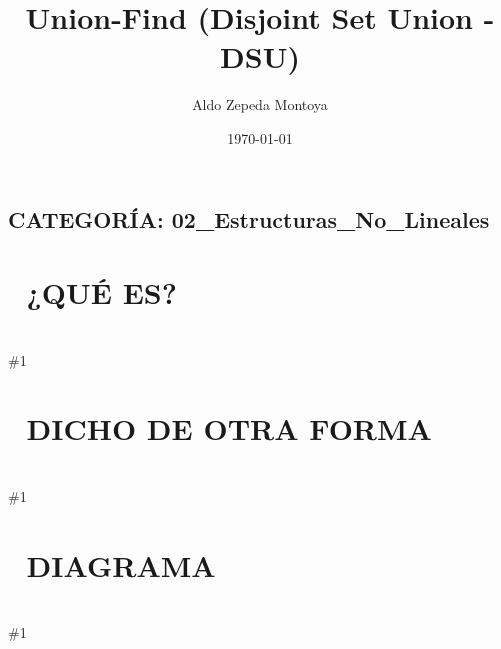 \documentclass{article}
\newcommand{\quees}[1]{
    \section*{🤔 ¿QUÉ ES?}
    \hrulefill \\
    \#1
}
\newcommand{\dichodeotraforma}[1]{
    \section*{💬 DICHO DE OTRA FORMA}
    \hrulefill \\
    \#1
}
\newcommand{\diagrama}[1]{
    \section*{🎨 DIAGRAMA}
    \hrulefill \\
    \#1
}
\begin{document}
\title{Union-Find (Disjoint Set Union - DSU)}
\author{Aldo Zepeda Montoya}
\date{\today}
\maketitle

\subsection*{CATEGORÍA: 02\_Estructuras\_No\_Lineales}

\quees{
Los clubes de la escuela 🏫. Al principio, cada estudiante es su
propio club (un conjunto de 1 persona). 

Cuando dos personas se hacen amigas, sus clubes se UNEN. Para saber 
si dos personas están en el mismo club, sigues la cadena de amistades
hasta llegar al "líder" del grupo. Si ambos tienen el mismo líder,
entonces ¡están en el mismo club!

Es una estructura que gestiona grupos de elementos que no se 
traslapan y te permite unirlos o preguntar si están conectados 
muy rápido.
}

\dichodeotraforma{
Union-Find (o DSU) es una estructura de datos que mantiene un 
conjunto de elementos divididos en varios conjuntos disjuntos. 
Soporta dos operaciones principales:

1. Find: Determina a qué conjunto pertenece un elemento (devuelve
   el "representante" o "líder" del conjunto).
2. Union: Une dos conjuntos en uno solo.

Con optimizaciones como "Path Compression" y "Union by Rank", estas
operaciones se vuelven prácticamente instantáneas O(α(n)).
}

\diagrama{\begin{verbatim}
Estado Inicial: {0} {1} {2} {3} {4}
(Cada uno apunta a sí mismo como líder)

Union(0, 1): {0, 1} {2} {3} {4}
  [0] ← [1] (0 es el líder de 1)

Union(1, 2): {0, 1, 2} {3} {4}
  [0] ← [1] ← [2]

Path Compression (al buscar el líder de 2):
  [0] ← [1], [0] ← [2] (Ahora 2 apunta directo al líder 0)
\end{verbatim}}
\end{document}
